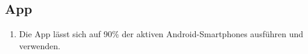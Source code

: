 \subsection*{App}

\begin{samepage}
    \begin{enumerate}[label=\textbf{/NFP\arabic*0/}, align=left]
        \item Die App lässt sich auf 90\% der aktiven \Gls{Android}-\Gls{Smartphone}s ausführen und verwenden.
    \end{enumerate}
\end{samepage}
